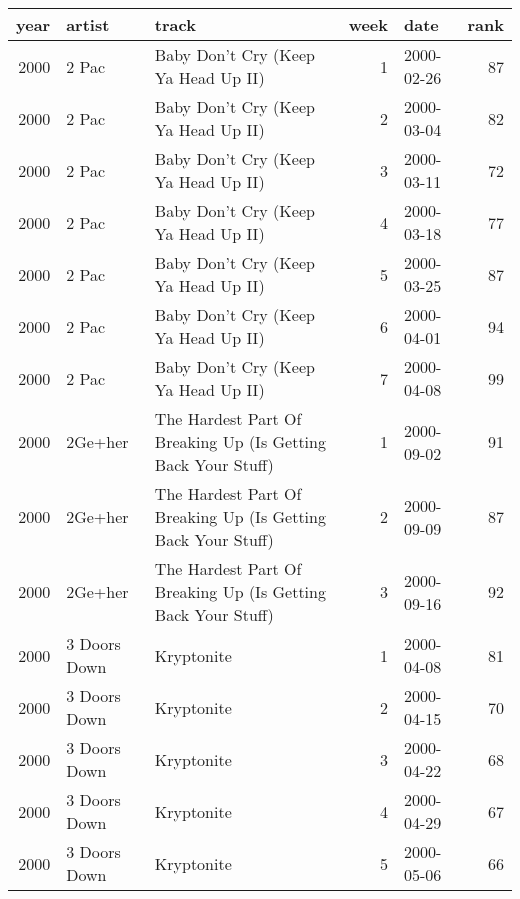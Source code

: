 \begin{tabular}{rllrlr}
  \toprule
 year & artist & track & week & date & rank \\ 
  \midrule
  2000 & 2 Pac & Baby Don't Cry (Keep Ya Head Up II) &   1 & 2000-02-26 &  87 \\ 
  2000 & 2 Pac & Baby Don't Cry (Keep Ya Head Up II) &   2 & 2000-03-04 &  82 \\ 
  2000 & 2 Pac & Baby Don't Cry (Keep Ya Head Up II) &   3 & 2000-03-11 &  72 \\ 
  2000 & 2 Pac & Baby Don't Cry (Keep Ya Head Up II) &   4 & 2000-03-18 &  77 \\ 
  2000 & 2 Pac & Baby Don't Cry (Keep Ya Head Up II) &   5 & 2000-03-25 &  87 \\ 
  2000 & 2 Pac & Baby Don't Cry (Keep Ya Head Up II) &   6 & 2000-04-01 &  94 \\ 
  2000 & 2 Pac & Baby Don't Cry (Keep Ya Head Up II) &   7 & 2000-04-08 &  99 \\ 
  2000 & 2Ge+her & The Hardest Part Of Breaking Up (Is Getting Back Your Stuff) &   1 & 2000-09-02 &  91 \\ 
  2000 & 2Ge+her & The Hardest Part Of Breaking Up (Is Getting Back Your Stuff) &   2 & 2000-09-09 &  87 \\ 
  2000 & 2Ge+her & The Hardest Part Of Breaking Up (Is Getting Back Your Stuff) &   3 & 2000-09-16 &  92 \\ 
  2000 & 3 Doors Down & Kryptonite &   1 & 2000-04-08 &  81 \\ 
  2000 & 3 Doors Down & Kryptonite &   2 & 2000-04-15 &  70 \\ 
  2000 & 3 Doors Down & Kryptonite &   3 & 2000-04-22 &  68 \\ 
  2000 & 3 Doors Down & Kryptonite &   4 & 2000-04-29 &  67 \\ 
  2000 & 3 Doors Down & Kryptonite &   5 & 2000-05-06 &  66 \\ 
   \bottomrule
\end{tabular}

